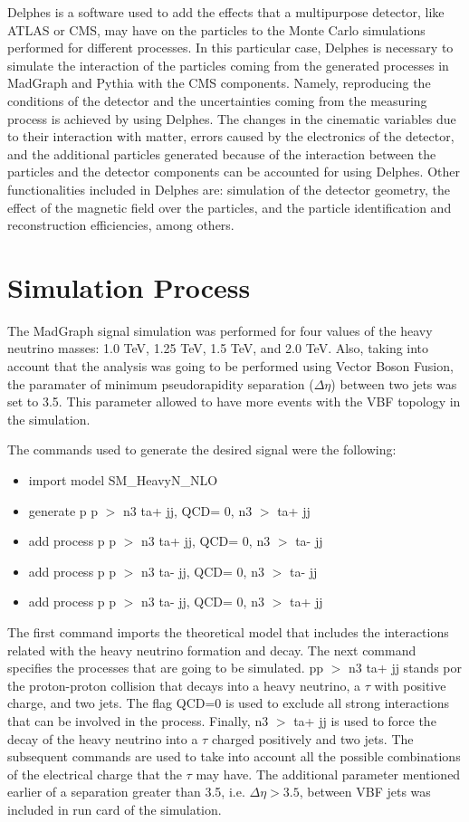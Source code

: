Delphes is a software used to add the effects that a multipurpose detector, like ATLAS or CMS, may have on the particles to the Monte Carlo simulations performed for different processes. In this particular case, Delphes is necessary to simulate the interaction of the particles coming from the generated processes in MadGraph and Pythia with the CMS components. Namely, reproducing the conditions of the detector and the uncertainties coming from the measuring process is achieved by using Delphes. The changes in the cinematic variables due to their interaction with matter, errors caused by the electronics of the detector, and the additional particles generated because of the interaction between the particles and the detector components can be accounted for using Delphes. Other functionalities included in Delphes are: simulation of the detector geometry, the effect of the magnetic field over the particles, and the particle identification and reconstruction efficiencies, among others.


\section{Simulation Process}

The MadGraph signal simulation was performed for four values of the heavy neutrino masses: 1.0 TeV, 1.25 TeV, 1.5 TeV, and 2.0 TeV. Also, taking into account that the analysis was going to be performed using Vector Boson Fusion, the paramater of minimum pseudorapidity separation ($\Delta \eta$) between two jets was set to 3.5. This parameter allowed to have more events with the VBF topology in the simulation.

The commands used to generate the desired signal were the following:

\begin{itemize}
\item import model SM\_HeavyN\_NLO
\item generate p p $>$ n3 ta+ jj, QCD= 0, n3 $>$ ta+ jj
\item add process p p $>$ n3 ta+ jj, QCD= 0, n3 $>$ ta- jj
\item add process p p $>$ n3 ta- jj, QCD= 0, n3 $>$ ta- jj
\item add process p p $>$ n3 ta- jj, QCD= 0, n3 $>$ ta+ jj

\end{itemize}

The first command imports the theoretical model that includes the interactions related with the heavy neutrino formation and decay. The next command specifies the processes that are going to be simulated. pp $>$ n3 ta+ jj stands por the proton-proton collision that decays into a heavy neutrino, a $\tau$ with positive charge, and two jets. The flag QCD=0 is used to exclude all strong interactions that can be involved in the process. Finally, n3 $>$ ta+ jj is used to force the decay of the heavy neutrino into a $\tau$ charged positively and two jets. The subsequent commands are used to take into account all the possible combinations of the electrical charge that the $\tau$ may have. The additional parameter mentioned earlier of a separation greater than 3.5, i.e. $\Delta \eta > 3.5$, between VBF jets was included in run card of the simulation.

